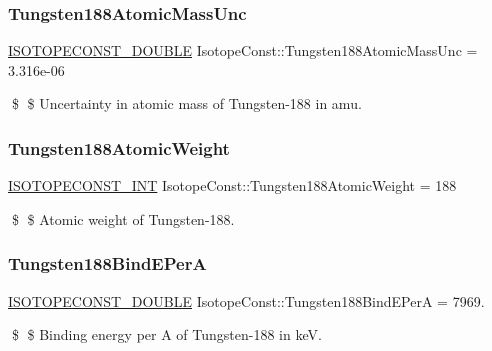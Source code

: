 \subsubsection{\texorpdfstring{Tungsten188\+Atomic\+Mass\+Unc}{Tungsten188AtomicMassUnc}}
{\footnotesize\ttfamily \mbox{\hyperlink{group___isotope_const-_macros_ga8f45a7272ce02c0b4c65c44636ed719a}{I\+S\+O\+T\+O\+P\+E\+C\+O\+N\+S\+T\+\_\+\+D\+O\+U\+B\+LE}} Isotope\+Const\+::\+Tungsten188\+Atomic\+Mass\+Unc = 3.\+316e-\/06}

\$ \$ Uncertainty in atomic mass of Tungsten-\/188 in amu. \mbox{\label{group___isotope_const-_tungsten-_w188_gad9aee5b904adbf5e6f58984f0db62963}} 
\subsubsection{\texorpdfstring{Tungsten188\+Atomic\+Weight}{Tungsten188AtomicWeight}}
{\footnotesize\ttfamily \mbox{\hyperlink{group___isotope_const-_macros_ga5f18360b3e99483a35c32d789e62621c}{I\+S\+O\+T\+O\+P\+E\+C\+O\+N\+S\+T\+\_\+\+I\+NT}} Isotope\+Const\+::\+Tungsten188\+Atomic\+Weight = 188}

\$ \$ Atomic weight of Tungsten-\/188. \mbox{\label{group___isotope_const-_tungsten-_w188_ga39833e032f020df93340565afbc0c6d1}} 
\subsubsection{\texorpdfstring{Tungsten188\+Bind\+E\+PerA}{Tungsten188BindEPerA}}
{\footnotesize\ttfamily \mbox{\hyperlink{group___isotope_const-_macros_ga8f45a7272ce02c0b4c65c44636ed719a}{I\+S\+O\+T\+O\+P\+E\+C\+O\+N\+S\+T\+\_\+\+D\+O\+U\+B\+LE}} Isotope\+Const\+::\+Tungsten188\+Bind\+E\+PerA = 7969.}

\$ \$ Binding energy per A of Tungsten-\/188 in keV. \mbox{\label{group___isotope_const-_tungsten-_w188_ga863d1e1e356490cb18ce3bc1433f98c6}} 
